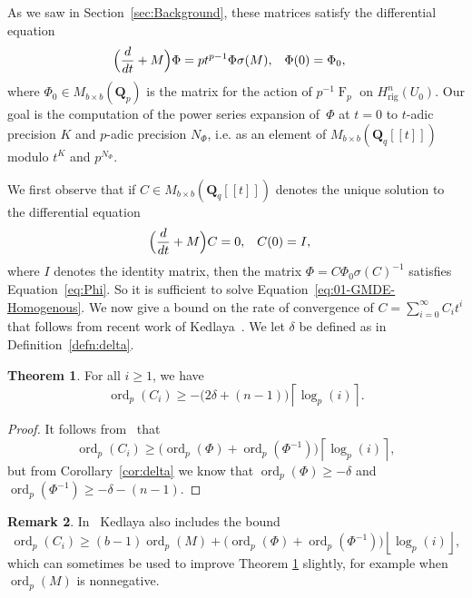 \documentclass[a4paper,11pt]{article}
\numberwithin{equation}{section}
\providecommand{\floor}[1]{\left\lfloor#1\right\rfloor}   %
\providecommand{\ceil}[1]{\left\lceil#1\right\rceil}   %
\newcommand{\QQ}{\mathbf{Q}} %
\DeclareMathOperator{\ord}{ord}          %
\DeclareMathOperator{\Frob}{F}           %
\providecommand{\Hrig}{H_{\text{rig}}}  %
\theoremstyle{definition}
\newtheorem{thm}{Theorem}[section]
\newtheorem{rem}[thm]{Remark}
\begin{document}
As we saw in Section~\ref{sec:Background}, these matrices satisfy 
the differential equation
\begin{align} \label{eq:Phi}
\Bigl(\frac{d}{dt} + M\Bigr) \Phi &= p t^{p-1} \Phi \sigma(M), &\Phi(0)& = \Phi_0, 
\end{align}
where $\Phi_0 \in M_{b \times b}(\QQ_p)$ is the matrix for the action 
of $p^{-1} \Frob_p$ on $\Hrig^n(U_0)$. Our goal is the computation of 
the power series expansion of~$\Phi$ at $t=0$ to $t$-adic precision $K$ 
and $p$-adic precision $N_{\Phi}$, i.e. as an element of 
$M_{b \times b}(\QQ_q[[t]])$ modulo $t^K$ and $p^{N_{\Phi}}$.

We first observe that if 
$C \in M_{b \times b}(\QQ_q[[t]])$ denotes 
the unique solution to the differential equation
\begin{align} \label{eq:01-GMDE-Homogenous}
\Bigl(\frac{d}{dt} + M\Bigr) C &= 0, &C(0)&=I, 
\end{align}
where $I$ denotes the identity matrix, 
then the matrix $\Phi = C \Phi_0 \sigma(C)^{-1}$ satisfies 
Equation~\eqref{eq:Phi}. So it is sufficient to solve 
Equation~\eqref{eq:01-GMDE-Homogenous}. 
We now give a bound on the rate of 
convergence of $C=\sum_{i=0}^{\infty} C_i t^i$ that
follows from recent work of 
Kedlaya~\citep{Kedlaya2010}. 
We let $\delta$ be defined as in Definition~\ref{defn:delta}. 

\begin{thm} \label{thm:valC}
For all $i \geq 1$, we have
\begin{equation*}
\ord_p(C_i) \geq - \bigl(2 \delta + (n - 1)\bigr) \ceil{\log_p(i)}.
\end{equation*}
\end{thm}

\begin{proof}
It follows from~\citep[Theorem~{18.3.3}]{Kedlaya2010} that
\begin{equation*}
\ord_p(C_i) \geq \bigl( \ord_p(\Phi) + \ord_p(\Phi^{-1}) \bigr) \ceil{\log_p(i)},
\end{equation*}
but from Corollary~\ref{cor:delta} we know that $\ord_p(\Phi) \geq -\delta$ and 
$\ord_p(\Phi^{-1}) \geq -\delta-(n-1)$.
\end{proof}

\begin{rem}
In~\citep[Remark~18.3.4]{Kedlaya2010} Kedlaya also includes the bound
\begin{equation*}
\ord_p(C_i) \geq (b - 1) \ord_p(M) 
            + \bigl( \ord_p(\Phi) + \ord_p(\Phi^{-1}) \bigr) \floor{\log_p(i)},
\end{equation*}
which can sometimes be used to improve Theorem \ref{thm:valC} 
slightly, for example when $\ord_p(M)$ is nonnegative.
\end{rem}
\end{document}
